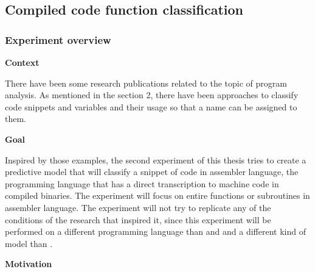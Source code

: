 \newpage
\subsection{Compiled code function classification}

\subsubsection{Experiment overview}

\textbf{Context}

There have been some research publications related to the topic of program analysis. As mentioned in the section 2, there have been approaches to classify code snippets \cite{code2vec} and variables \cite{139} and their usage so that a name can be assigned to them. 

\textbf{Goal}

Inspired by those examples, the second experiment of this thesis tries to create a predictive model that will classify a snippet of code in assembler language, the programming language that has a direct transcription to machine code in compiled binaries. The experiment will focus on entire functions or subroutines in assembler language. The experiment will not try to replicate any of the conditions of the research that inspired it, since this experiment will be performed on a different programming language than \cite{139} and \cite{code2vec} and a different kind of model than \cite{code2vec}.

\textbf{Motivation}

